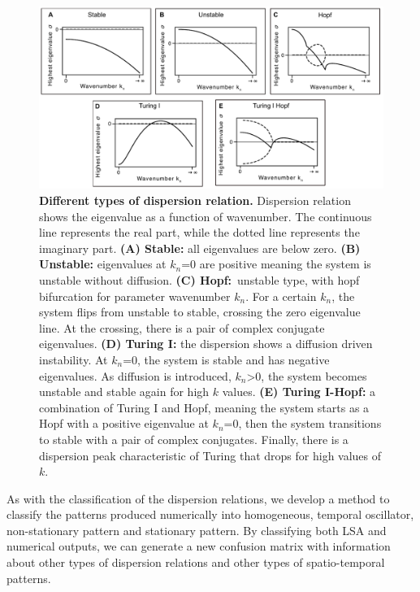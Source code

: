 \begin{figure}[H] %
    \centering
    \includegraphics[width=1\textwidth]{chapters/Chapter 1/dispersions} %
    \caption{\textbf{Different types of dispersion relation.} Dispersion relation shows the eigenvalue as a function of wavenumber. The continuous line represents the real part, while the dotted line represents the imaginary part. \textbf{(A) Stable:} all eigenvalues are below zero. \textbf{(B) Unstable:} eigenvalues at $k_{n}$=0 are positive meaning the system is unstable without diffusion. \textbf{(C) Hopf:}~unstable type, with hopf bifurcation for parameter wavenumber $k_{n}$. For a certain $k_{n}$, the system flips from unstable to stable, crossing the zero eigenvalue line. At the crossing, there is a pair of complex conjugate eigenvalues. \textbf{(D) Turing I:} the dispersion shows a diffusion driven instability. At $k_{n}$=0, the system is stable and has negative eigenvalues. As diffusion is introduced, $k_{n}$>0, the system becomes unstable and stable again for high $k$ values. \textbf{(E) Turing I-Hopf:} a combination of Turing I and Hopf, meaning the system starts as a Hopf with a positive eigenvalue at $k_{n}$=0, then the system transitions to stable with a pair of complex conjugates. Finally, there is a dispersion peak characteristic of Turing that drops for high values of $k$.}
    \label{fig:dispersions} %
\end{figure}

As with the classification of the dispersion relations, we develop a method to classify the patterns produced numerically into homogeneous, temporal oscillator, non-stationary pattern and stationary pattern.
By classifying both LSA and numerical outputs, we can generate a new confusion matrix with information about other types of dispersion relations and other types of spatio-temporal patterns.

